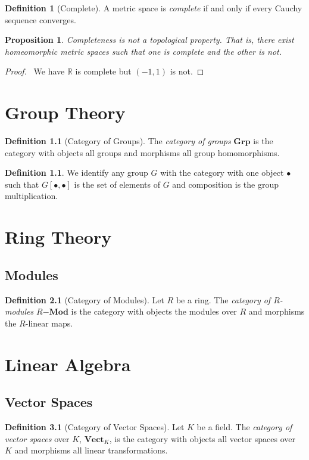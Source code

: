 \documentclass{book}
\let\qed\relax
\newtheorem{proposition}[lemma]{Proposition}
\theoremstyle{definition}
\newtheorem{definition}[lemma]{Definition}
\newcommand{\Real}{\ensuremath{\mathbb{R}}}
\begin{document}
\begin{definition}[Complete]
    A metric space is \emph{complete} if and only if every Cauchy sequence converges.
\end{definition}

\begin{proposition}
    Completeness is not a topological property. That is, there exist homeomorphic metric spaces such that one is complete and the other is
    not.
\end{proposition}

\begin{proof}
    \pf\ We have $\Real$ is complete but $(-1,1)$ is not. \qed
\end{proof}

\chapter{Group Theory}

\begin{definition}[Category of Groups]
    The \emph{category of groups} $\mathbf{Grp}$ is the category with objects all groups and morphisms all group homomorphisms.
\end{definition}

\begin{definition}
    We identify any group $G$ with the category with one object $\bullet$ such that $G[\bullet,\bullet]$ is the set of elements
    of $G$ and composition is the group multiplication.
\end{definition}

\chapter{Ring Theory}

\section{Modules}

\begin{definition}[Category of Modules]
    Let $R$ be a ring. The \emph{category of $R$-modules} $R\mathbf{-Mod}$ is the category with objects the modules over $R$
    and morphisms the $R$-linear maps.
\end{definition}

\chapter{Linear Algebra}

\section{Vector Spaces}

\begin{definition}[Category of Vector Spaces]
    Let $K$ be a field. The \emph{category of vector spaces} over $K$, $\mathbf{Vect}_K$,
    is the category with objects all vector spaces over $K$ and morphisms all linear transformations.
\end{definition}
\end{document}
